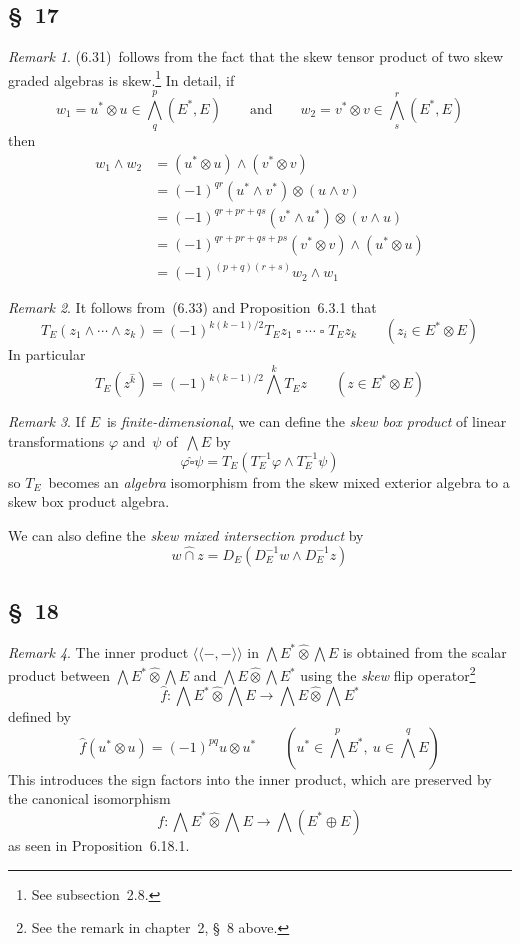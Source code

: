 \documentclass[letterpaper,12pt]{article}
\newcommand{\ssect}{\mathbin{\widehat{\cap}}}
\newcommand{\dsum}{\oplus}
\newcommand{\tprod}{\otimes}
\newcommand{\stprod}{\mathbin{\widehat{\otimes}}}
\newcommand{\eprod}{\wedge}
\newcommand{\bigeprod}{\bigwedge}
\newcommand{\medeprod}{{\textstyle\bigeprod}}
\newcommand{\bprod}{\mathbin{\square}}
\newcommand{\sbprod}{\mathbin{\widehat{\square}}}
\newcommand{\ssprod}[2]{\langle\!\langle#1,#2\rangle\!\rangle}
\newcommand{\multi}[4]{#2_{#3}#1\cdots#1#2_{#4}}
\newcommand{\eprods}[3]{\multi{\eprod}{#1}{#2}{#3}}
\newcommand{\bprods}[3]{\multi{\bprod}{#1}{#2}{#3}}
\theoremstyle{definition}
\theoremstyle{remark}
\newtheorem*{rmk}{Remark}
\begin{document}
\subsection*{\S~17}
\begin{rmk}
(6.31)~follows from the fact that the skew tensor product of two skew graded algebras is skew.\footnote{See subsection~2.8.} In detail, if
\[w_1=u^*\tprod u\in\medeprod^p_q(E^*,E)\qquad\text{and}\qquad w_2=v^*\tprod v\in\medeprod^r_s(E^*,E)\]
then
\begin{align*}
w_1\eprod w_2&=(u^*\tprod u)\eprod(v^*\tprod v)\\
	&=(-1)^{qr}(u^*\eprod v^*)\tprod(u\eprod v)\\
	&=(-1)^{qr+pr+qs}(v^*\eprod u^*)\tprod(v\eprod u)\\
	&=(-1)^{qr+pr+qs+ps}(v^*\tprod v)\eprod(u^*\tprod u)\\
	&=(-1)^{(p+q)(r+s)}w_2\eprod w_1
\end{align*}
\end{rmk}

\begin{rmk}
It follows from~(6.33) and Proposition~6.3.1 that
\[T_E(\eprods{z}{1}{k})=(-1)^{k(k-1)/2}\bprods{T_Ez}{1}{k}\qquad(z_i\in E^*\tprod E)\]
In particular
\[T_E(z^{\widehat{k}})=(-1)^{k(k-1)/2}\medeprod^k T_Ez\qquad(z\in E^*\tprod E)\]
\end{rmk}

\begin{rmk}
If \(E\)~is \emph{finite-dimensional}, we can define the \emph{skew box product} of linear transformations \(\varphi\) and~\(\psi\) of~\(\medeprod E\) by
\[\varphi\sbprod\psi=T_E(T_E^{-1}\varphi\eprod T_E^{-1}\psi)\]
so \(T_E\)~becomes an \emph{algebra} isomorphism from the skew mixed exterior algebra to a skew box product algebra.

We can also define the \emph{skew mixed intersection product} by
\[w\ssect z=D_E(D_E^{-1}w\eprod D_E^{-1}z)\]
\end{rmk}

\subsection*{\S~18}
\begin{rmk}
The inner product \(\ssprod{-}{-}\) in \(\medeprod E^*\stprod\medeprod E\) is obtained from the scalar product between \(\medeprod E^*\stprod\medeprod E\) and \(\medeprod E\stprod\medeprod E^*\) using the \emph{skew} flip operator\footnote{See the remark in chapter~2, \S~8 above.}
\[\widehat{f}:\medeprod E^*\stprod\medeprod E\to\medeprod E\stprod\medeprod E^*\]
defined by
\[\widehat{f}(u^*\tprod u)=(-1)^{pq}u\tprod u^*\qquad(u^*\in\medeprod^p E^*,\ u\in\medeprod^q E)\]
This introduces the sign factors into the inner product, which are preserved by the canonical isomorphism
\[f:\medeprod E^*\stprod\medeprod E\to\medeprod(E^*\dsum E)\]
as seen in Proposition~6.18.1.
\end{rmk}
\end{document}
